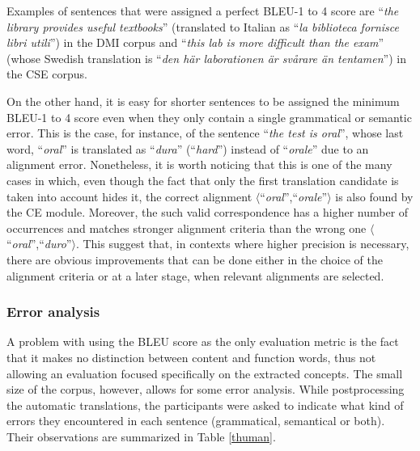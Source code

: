 Examples of sentences that were assigned a perfect BLEU-1 to 4 score are ``\textit{the library provides useful textbooks}'' (translated to Italian as ``\textit{la biblioteca fornisce libri utili}'') in the DMI corpus and ``\textit{this lab is more difficult than the exam}'' (whose Swedish translation is ``\textit{den här laborationen är svårare än tentamen}'') in the CSE corpus. \smallskip

On the other hand, it is easy for shorter sentences to be assigned the minimum BLEU-1 to 4 score even when they only contain a single grammatical or semantic error. 
This is the case, for instance, of the sentence ``\textit{the test is oral}'', whose last word, ``\textit{oral}'' is translated as ``\textit{dura}'' (``\textit{hard}'') instead of ``\textit{orale}'' due to an alignment error. 
Nonetheless, it is worth noticing that this is one of the many cases in which, even though the fact that only the first translation candidate is taken into account hides it, the correct alignment $\langle$``\textit{oral}'',``\textit{orale}''$\rangle$ is also found by the CE module. 
Moreover, the such valid correspondence has a higher number of occurrences and matches stronger alignment criteria than the wrong one $\langle$``\textit{oral}'',``\textit{duro}''$\rangle$. 
This suggest that, in contexts where higher precision is necessary, there are obvious improvements that can be done either in the choice of the alignment criteria or at a later stage, when relevant alignments are selected. \smallskip

\subsubsection{Error analysis}
A problem with using the BLEU score as the only evaluation metric is the fact that it makes no distinction between content and function words, thus not allowing an evaluation focused specifically on the extracted concepts. 
The small size of the corpus, however, allows for some error analysis. 
While postprocessing the automatic translations, the participants were asked to indicate what kind of errors they encountered in each sentence (grammatical, semantical or both). Their observations are summarized in Table \ref{thuman}. \smallskip

